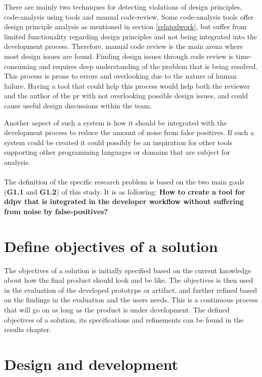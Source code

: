\documentclass{report}
\begin{document}
There are mainly two techniques for detecting violations of design principles, code-analysis using tools and manual code-review. Some code-analysis tools offer design principle analysis as mentioned in section \ref{relatedwork}, but suffer from limited functionality regarding design principles and not being integrated into the development process. Therefore, manual code review is the main arena where most design issues are found. Finding design issues through code review is time-consuming and requires deep understanding of the problem that is being resolved. This process is prone to errors and overlooking due to the nature of human failure. Having a tool that could help this process would help both the reviewer and the author of the \gls{pr} with not overlooking possible design issues, and could cause useful design discussions within the team.

Another aspect of such a system is how it should be integrated with the development process to reduce the amount of noise from false positives. If such a system could be created it could possibly be an inspiration for other tools supporting other programming languages or domains that are subject for analysis. \\

\\ The definition of the specific research problem is based on the two main goals (\textbf{G1.1} and \textbf{G1.2}) of this study. It is as following: \textbf{How to create a tool for \gls{ddpv} that is integrated in the developer workflow without suffering from noise by false-positives?}

\section{Define objectives of a solution}
\label{objectives-of-solution}
The objectives of a solution is initially specified based on the current knowledge about how the final product should look and be like. The objectives is then used in the evaluation of the developed prototype or artifact, and further refined based on the findings in the evaluation and the users needs. This is a continuous process that will go on as long as the product is under development. The defined objectives of a solution, its specifications and refinements can be found in the results chapter.

\section{Design and development}
\label{design-development}
\end{document}
